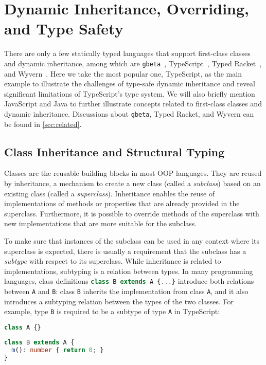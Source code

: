 \section{Dynamic Inheritance, Overriding, and Type Safety} \label{sec:background}

There are only a few statically typed languages that support first-class classes
and dynamic inheritance, among which are \texttt{gbeta}~\citep{ernst2000gbeta},
TypeScript~\citep{typescript}, Typed Racket~\citep{takikawa2012gradual}, and
Wyvern~\citep{lee2015theory}. Here we take the most popular one, TypeScript, as
the main example to illustrate the challenges of type-safe dynamic inheritance
and reveal significant limitations of TypeScript's type system. We will also
briefly mention JavaScript and Java to further illustrate concepts related to
first-class classes and dynamic inheritance. Discussions about \texttt{gbeta},
Typed Racket, and Wyvern can be found in \autoref{sec:related}.

\subsection{Class Inheritance and Structural Typing} \label{sec:bivariant}
Classes are the reusable building blocks in most OOP languages. They are reused
by inheritance, a mechanism to create a new class (called a \emph{subclass})
based on an existing class (called a \emph{superclass}). Inheritance enables the
reuse of implementations of methods or properties that are already provided in
the superclass. Furthermore, it is possible to override methods of the
superclass with new implementations that are more suitable for the subclass.

To make sure that instances of the subclass can be used in any context where its
superclass is expected, there is usually a requirement that the subclass has a
\emph{subtype} with respect to its superclass. While inheritance is related to
implementations, subtyping is a relation between types. In many programming
languages, class definitions
\lstinline[language=TypeScript]|class B extends A {...}| introduce both
relations between \lstinline{A} and \lstinline{B}: class \lstinline{B} inherits
the implementation from class \lstinline{A}, and it also introduces a subtyping
relation between the types of the two classes. For example, type \lstinline{B}
is required to be a subtype of type \lstinline{A} in TypeScript:

\noindent
\begin{minipage}{.5\textwidth}
\begin{lstlisting}[language=TypeScript]
class A {}
\end{lstlisting}
\end{minipage}%
\begin{minipage}{.5\textwidth}
\begin{lstlisting}[language=TypeScript]
class B extends A {
  m(): number { return 0; }
}
\end{lstlisting}
\end{minipage}

